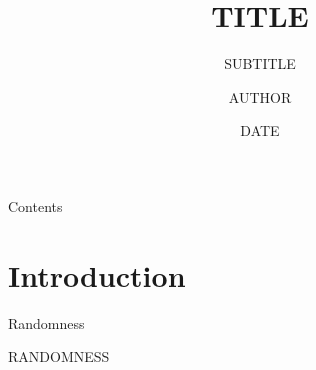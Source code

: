 \documentclass[aspectratio=43]{beamer}
\title{TITLE}
\subtitle{SUBTITLE}
\author{AUTHOR}
\date{DATE}
\begin{document}
	\maketitle
	\begin{frame}{Contents}
		\tableofcontents
	\end{frame}

	\section{Introduction}
	
	\begin{frame}{Randomness}
		
		\begin{block}{}
			RANDOMNESS	
		\end{block}
		
	\end{frame}
\end{document}
